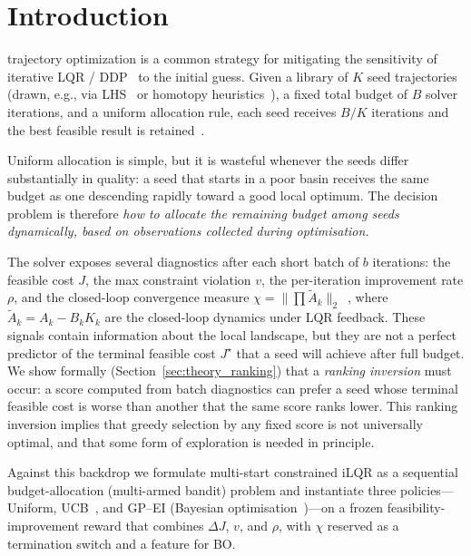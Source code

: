 \documentclass[lettersize,journal]{IEEEtran}
\begin{document}
\section{Introduction}

 trajectory optimization is a common strategy for mitigating the
sensitivity of iterative LQR / DDP~\cite{tassa2012,howell2019,mastalli2020} to the initial guess.
Given a library of $K$ seed trajectories (drawn, e.g., via
LHS~\cite{mckay1979} or homotopy heuristics~\cite{merkt2021}),
a fixed total budget of $B$ solver iterations, and a uniform allocation
rule, each seed receives $B/K$ iterations and the best feasible result is
retained~\cite{gyorgy2011,jain2019}.

Uniform allocation is simple, but it is wasteful whenever the seeds differ
substantially in quality: a seed that starts in a poor basin receives the same
budget as one descending rapidly toward a good local optimum.  The decision
problem is therefore \emph{how to allocate the remaining budget among seeds
dynamically, based on observations collected during optimisation.}

The solver exposes several diagnostics after each short batch of $b$
iterations: the feasible cost $J$, the max constraint violation $v$, the
per-iteration improvement rate $\rho$, and the closed-loop convergence
measure $\chi = \|\prod \tilde{A}_k\|_2$~\cite{zhu2024}, where
$\tilde{A}_k = A_k - B_k K_k$ are the closed-loop dynamics under LQR
feedback.  These signals contain
information about the local landscape, but they are not a perfect predictor
of the terminal feasible cost $J^\star$ that a seed will achieve after full
budget.  We show formally (Section~\ref{sec:theory_ranking}) that a
\emph{ranking inversion} must occur: a score computed from batch diagnostics
can prefer a seed whose terminal feasible cost is worse than another that the
same score ranks lower.  This ranking inversion implies that greedy
selection by any fixed score is not universally optimal, and that some
form of exploration is needed in principle.

Against this backdrop we formulate multi-start constrained iLQR as a
sequential budget-allocation (multi-armed bandit) problem and instantiate
three policies---Uniform, UCB~\cite{auer2002}, and GP--EI (Bayesian
optimisation~\cite{srinivas2010,shahriari2016})---on a frozen
feasibility-improvement reward that combines $\Delta J$, $v$, and $\rho$,
with $\chi$ reserved as a termination switch and a feature for BO.
\end{document}
